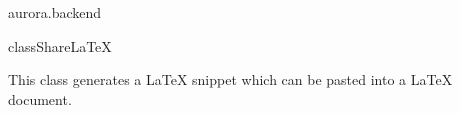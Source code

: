 \begin{texdocpackage}{aurora.backend}
\begin{texdocclass}{class}{ShareLaTeX}
\label{texdoclet:aurora.backend.ShareLaTeX}
\begin{texdocclassintro}
This class generates a LaTeX snippet which can be pasted into a LaTeX document.\end{texdocclassintro}
\begin{texdocclassconstructors}
\end{texdocclassconstructors}
\begin{texdocclassmethods}
\end{texdocclassmethods}
\end{texdocclass}



\end{texdocpackage}
